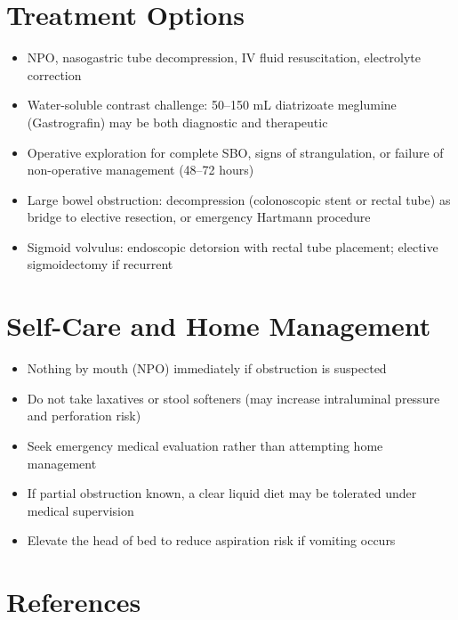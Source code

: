 \section*{Treatment Options}
\begin{itemize}
  \item NPO, nasogastric tube decompression, IV fluid resuscitation, electrolyte correction
  \item Water-soluble contrast challenge: 50--150 mL diatrizoate meglumine (Gastrografin) may be both diagnostic and therapeutic
  \item Operative exploration for complete SBO, signs of strangulation, or failure of non-operative management (48--72 hours)
  \item Large bowel obstruction: decompression (colonoscopic stent or rectal tube) as bridge to elective resection, or emergency Hartmann procedure
  \item Sigmoid volvulus: endoscopic detorsion with rectal tube placement; elective sigmoidectomy if recurrent
\end{itemize}

\section*{Self-Care and Home Management}
\begin{itemize}
  \item Nothing by mouth (NPO) immediately if obstruction is suspected
  \item Do not take laxatives or stool softeners (may increase intraluminal pressure and perforation risk)
  \item Seek emergency medical evaluation rather than attempting home management
  \item If partial obstruction known, a clear liquid diet may be tolerated under medical supervision
  \item Elevate the head of bed to reduce aspiration risk if vomiting occurs
\end{itemize}

\section*{References}

